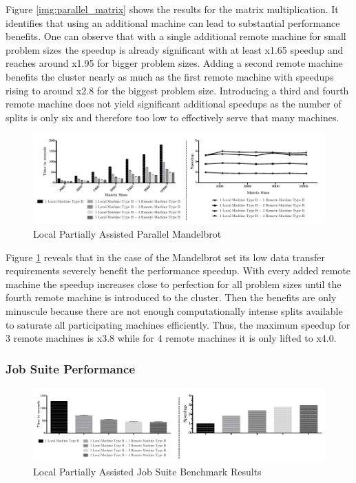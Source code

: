 Figure \ref{img:parallel_matrix} shows the results for the matrix multiplication. It identifies that using an additional machine can lead to substantial performance benefits. One can observe that with a single additional remote machine for small problem sizes the speedup is already significant with at least x1.65 speedup and reaches around x1.95 for bigger problem sizes. Adding a second remote machine benefits the cluster nearly as much as the first remote machine with speedups rising to around x2.8 for the biggest problem size. Introducing a third and fourth remote machine does not yield significant additional speedups as the number of splits is only six and therefore too low to effectively serve that many machines.

\begin{figure}[H]

	\includegraphics[width=1.0\textwidth]{images/local_partially_assisted_mandelbrot.pdf}
	\centering
	\caption{Local Partially Assisted Parallel Mandelbrot}
	\label{img:parallel_mandelbrot}
\end{figure}

Figure \ref{img:parallel_mandelbrot} reveals that in the case of the Mandelbrot set its low data transfer requirements severely benefit the performance speedup. With every added remote machine the speedup increases close to perfection for all problem sizes until the fourth remote machine is introduced to the cluster. Then the benefits are only minuscule because there are not enough computationally intense splits available to saturate all participating machines efficiently. Thus, the maximum speedup for 3 remote machines is x3.8 while for 4 remote machines it is only lifted to x4.0.


\subsubsection*{Job Suite Performance}
\label{job_suite_performance}

\begin{figure}[H]

	\includegraphics[width=1.0\textwidth]{images/local_partially_assisted_full_benchmark.pdf}
	\centering
	\caption{Local Partially Assisted Job Suite Benchmark Results}
	\label{img:local_benchmark_results}
\end{figure}

